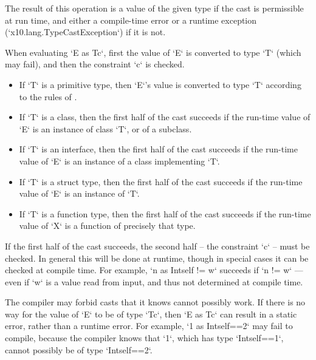 The result of this operation is a value of the given type if the cast
is permissible at run time, and either a compile-time error or a runtime
exception 
(\xcd`x10.lang.TypeCastException`) if it is not.  

When evaluating \xcd`E as T{c}`, first the value of \xcd`E` is converted to
type \xcd`T` (which may fail), and then the constraint \xcd`{c}` is checked. 



\begin{itemize}
\item If \xcd`T` is a primitive type, then \xcd`E`'s value is converted to type
      \xcd`T` according to the rules of
      . 
      
\item If \xcd`T` is a class, then the first half of the cast succeeds if the
      run-time value of \xcd`E` is an instance of class \xcd`T`, or of a
      subclass. 

\item If \xcd`T` is an interface, then the first half of the cast succeeds if
      the run-time value of \xcd`E` is an instance of a class implementing
      \xcd`T`. 

\item If \xcd`T` is a struct type, then the first half of the cast succeeds if
      the run-time value of \xcd`E` is an instance of \xcd`T`.  

\item If \xcd`T` is a function type, then the first half of the cast succeeds
      if the run-time value of \xcd`X` is a function of precisely that type.
\end{itemize}

If the first half of the cast succeeds, the second half -- the constraint
\xcd`{c}` -- must be checked.  In general this will be done at runtime, though
in special cases it can be checked at compile time.   For example, 
\xcd`n as Int{self != w}` succeeds if \xcd`n != w` --- even if \xcd`w` is a value
read from input, and thus not determined at compile time.

The compiler may forbid casts that it knows cannot possibly work. If there is
no way for the value of \xcd`E` to be of type \xcd`T{c}`, then 
\xcd`E as T{c}` can result in a static error, rather than a runtime error.  
For example, \xcd`1 as Int{self==2}` may fail to compile, because the compiler
knows that \xcd`1`, which has type \xcd`Int{self==1}`, cannot possibly be of
type \xcd`Int{self==2}`. 


